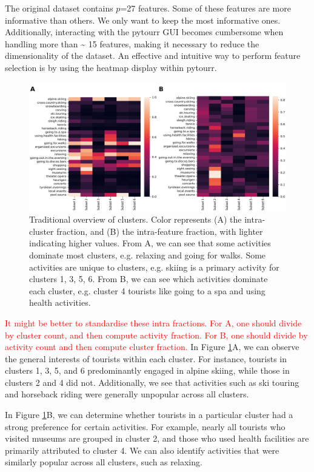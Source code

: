 \documentclass[article]{ajs}
\begin{document}
The original dataset contains \(p\)=27 features. Some of these features are more informative than others. We only want to keep the most informative ones. Additionally, interacting with the pytourr GUI becomes cumbersome when handling more than \textasciitilde
 15 features, making it necessary to reduce the dimensionality of the dataset. An effective and intuitive way to perform feature selection is by using the heatmap display within pytourr. 

\begin{figure}[h!]
    \centering
    \includegraphics[width=1\textwidth]{winteractiv_heatmap.png}
    \caption{Traditional overview of clusters. Color represents  (A) the intra-cluster fraction, and (B) the intra-feature fraction, with lighter indicating higher values. From A, we can see that some activities dominate most clusters, e.g. relaxing and going for walks. Some activities are unique to clusters, e.g. skiing is a primary activity for clusters 1, 3, 5, 6. From B, we can see which activities dominate each cluster, e.g. cluster 4 tourists like going to a spa and using health activities.}
    \label{fig:winteractiv_heatmap}
\end{figure}

\textcolor{red}{It might be better to standardise these intra fractions. For A, one should divide by cluster count, and then compute activity fraction. For B, one should divide by activity count and then compute cluster fraction.} In Figure \ref{fig:winteractiv_heatmap}A, we can observe the general interests of tourists within each cluster. For instance, tourists in clusters 1, 3, 5, and 6 predominantly engaged in alpine skiing, while those in clusters 2 and 4 did not. Additionally, we see that activities such as ski touring and horseback riding were generally unpopular across all clusters.

In Figure \ref{fig:winteractiv_heatmap}B, we can determine whether tourists in a particular cluster had a strong preference for certain activities. For example, nearly all tourists who visited museums are grouped in cluster 2, and those who used health facilities are primarily attributed to cluster 4. We can also identify activities that were similarly popular across all clusters, such as relaxing.
\end{document}
